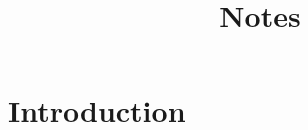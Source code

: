 \documentclass[a4paper]{amsart}
\title{Notes}
\begin{document}
\begin{abstract}
    
\end{abstract}

\maketitle

\section{Introduction}
\end{document}
